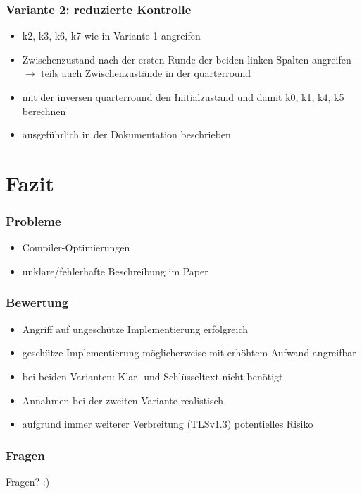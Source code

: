 \documentclass[ngerman]{beamer}
\begin{document}
\begin{frame}

    \frametitle{Variante 2: reduzierte Kontrolle}


    \begin{itemize}
        \item k2, k3, k6, k7 wie in Variante 1 angreifen
        \item Zwischenzustand nach der ersten Runde der beiden linken Spalten
            angreifen $\rightarrow$ teils auch Zwischenzustände in der
            quarterround
        \item mit der inversen quarterround den Initialzustand und damit k0, k1,
            k4, k5 berechnen
        \item ausgeführlich in der Dokumentation beschrieben
    \end{itemize}

\end{frame}



\section{Fazit}

\begin{frame}

    \frametitle{Probleme}


    \begin{itemize}
        \item Compiler-Optimierungen
        \item unklare/fehlerhafte Beschreibung im Paper
    \end{itemize}

\end{frame}



\begin{frame}

    \frametitle{Bewertung}


    \begin{itemize}
        \item Angriff auf ungeschütze Implementierung erfolgreich
        \item geschütze Implementierung möglicherweise mit erhöhtem Aufwand
            angreifbar
        \item bei beiden Varianten: Klar- und Schlüsseltext nicht benötigt
        \item Annahmen bei der zweiten Variante realistisch
        \item aufgrund immer weiterer Verbreitung (TLSv1.3) potentielles Risiko
    \end{itemize}

\end{frame}



\begin{frame}

    \frametitle{Fragen}


    Fragen? :)

\end{frame}
\end{document}
